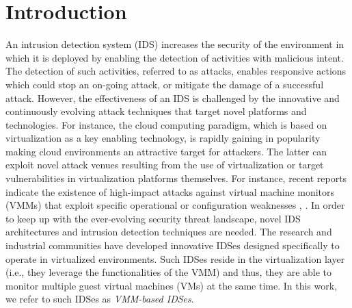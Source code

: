 



\section{Introduction}
\label{sec:introduction}

An intrusion detection system (IDS) increases the security of the environment in which it is deployed by enabling the detection of activities with malicious intent. The detection of such activities, referred to as attacks, enables responsive actions which could stop an on-going attack, or mitigate the damage of a successful attack. However, the effectiveness of an IDS is challenged by the innovative and continuously evolving attack techniques that target novel platforms and technologies. For instance, the cloud computing paradigm, which is based on virtualization as a key enabling technology, is rapidly gaining in popularity making cloud environments an attractive target for attackers.  The latter can exploit novel attack venues resulting from the use of virtualization or target vulnerabilities in virtualization platforms themselves. For instance, recent reports indicate the existence of high-impact attacks against virtual machine monitors (VMMs) that exploit specific operational or configuration weaknesses \cite{ibm:midterm}, \cite{informationweek:vulnerability}. In order to keep up with the ever-evolving security threat landscape, novel IDS architectures and intrusion detection techniques are needed. The research and industrial communities have developed innovative IDSes designed specifically to operate in virtualized environments. Such IDSes reside in the virtualization layer (i.e., they leverage the functionalities of the VMM) and thus, they are able to monitor multiple guest virtual machines (VMs) at the same time. In this work, we refer to such IDSes as \emph{VMM-based IDSes}.

